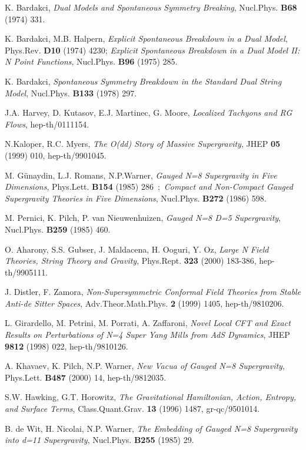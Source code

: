 \documentclass[a4paper,a4paper]{article}
\begin{document}
\begin{thebibliography}{99}
K. Bardakci, 
{\it Dual Models and Spontaneous Symmetry Breaking}, 
Nucl.Phys. {\bf B68} (1974) 331.

K. Bardakci, M.B. Halpern, 
{\it Explicit Spontaneous Breakdown in a Dual Model}, 
Phys.Rev. {\bf D10} (1974) 4230; 
{\it Explicit Spontaneous Breakdown in a Dual Model II: N Point Functions}, 
Nucl.Phys. {\bf B96} (1975) 285.

K. Bardakci, 
{\it Spontaneous Symmetry Breakdown in the Standard Dual String Model}, 
Nucl.Phys. {\bf B133} (1978) 297. 

J.A. Harvey, D. Kutasov, E.J. Martinec, G. Moore, 
{\it Localized Tachyons and RG Flows}, 
hep-th/0111154. 

N.Kaloper, R.C. Myers, 
{\it The O(dd) Story of Massive Supergravity}, 
JHEP {\bf 05} (1999) 010, hep-th/9901045. 

M. G\"unaydin, L.J. Romans, N.P.Warner, 
{\it Gauged N=8 Supergravity in Five Dimensions}, 
Phys.Lett. {\bf B154} (1985) 286\ ;\ 
{\it Compact and Non-Compact Gauged Supergravity Theories in Five Dimensions}, 
Nucl.Phys. {\bf B272} (1986) 598.

M. Pernici, K. Pilch, P. van Nieuwenhuizen, 
{\it Gauged N=8 D=5 Supergravity}, 
Nucl.Phys. {\bf B259} (1985) 460.

O. Aharony, S.S. Gubser, J. Maldacena, H. Ooguri, Y. Oz, 
{\it Large N Field Theories, String Theory and Gravity}, 
Phys.Rept. {\bf 323} (2000) 183-386, hep-th/9905111. 

J. Distler, F. Zamora, 
{\it Non-Supersymmetric Conformal Field Theories from Stable Anti-de Sitter Spaces}, 
Adv.Theor.Math.Phys. {\bf 2} (1999) 1405, hep-th/9810206. 

L. Girardello, M. Petrini, M. Porrati, A. Zaffaroni, 
{\it Novel Local CFT and Exact Results on Perturbations of N=4 Super Yang Mills from AdS Dynamics}, 
JHEP {\bf 9812} (1998) 022, hep-th/9810126. 

A. Khavaev, K. Pilch, N.P. Warner, 
{\it New Vacua of Gauged N=8 Supergravity}, 
Phys.Lett. {\bf B487} (2000) 14, hep-th/9812035. 

S.W. Hawking, G.T. Horowitz, 
{\it The Gravitational Hamiltonian, Action, Entropy, and Surface Terms}, 
Class.Quant.Grav. {\bf 13} (1996) 1487, gr-qc/9501014. 

B. de Wit, H. Nicolai, N.P. Warner, 
{\it The Embedding of Gauged N=8 Supergravity into d=11 Supergravity}, 
Nucl.Phys. {\bf B255} (1985) 29. 


\end{thebibliography}
\end{document}
